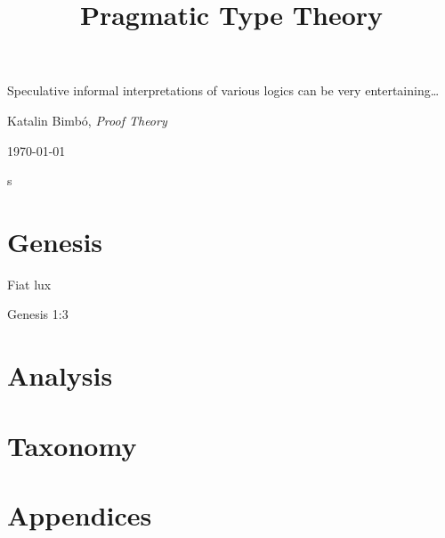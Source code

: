 \documentclass[12pt,book]{memoir}
\begin{document}
\nocite{*}
\title{Pragmatic Type Theory}
\date{}
\titlingpageend{\clearpage}{\clearpage}
\begin{titlingpage}
  \maketitle
\epigraph{Speculative informal interpretations of various logics can be very entertaining\ldots}{Katalin Bimbó, \textit{Proof Theory} \parencite{bimbo2014proof}}
\end{titlingpage}

\today
\newpage

\hypertarget{toc}{s}
\tableofcontents*

\mainmatter

\nopartblankpage
\makeatletter
\renewcommand*{\afterpartskip}{\par\vskip2ex
\@afterindentfalse} %
\makeatother

\part{Genesis}
\epigraph{Fiat lux}
         {Genesis 1:3}
\newpage






\part{Analysis}



\part{Taxonomy}


\part{Appendices}
\appendix







\nocite{*}



\end{document}
